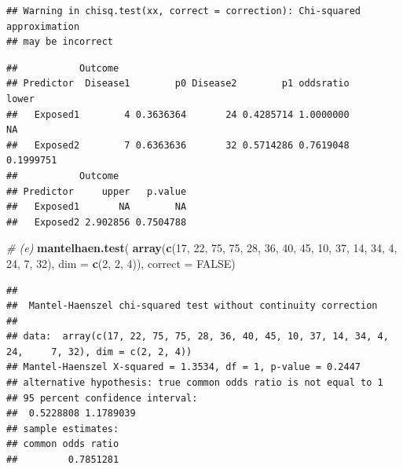 \documentclass[]{article}
\newenvironment{Shaded}{\begin{snugshade}}{\end{snugshade}}
\newcommand{\KeywordTok}[1]{\textcolor[rgb]{0.13,0.29,0.53}{\textbf{#1}}}
\newcommand{\DataTypeTok}[1]{\textcolor[rgb]{0.13,0.29,0.53}{#1}}
\newcommand{\DecValTok}[1]{\textcolor[rgb]{0.00,0.00,0.81}{#1}}
\newcommand{\CommentTok}[1]{\textcolor[rgb]{0.56,0.35,0.01}{\textit{#1}}}
\newcommand{\OtherTok}[1]{\textcolor[rgb]{0.56,0.35,0.01}{#1}}
\newcommand{\NormalTok}[1]{#1}
\begin{document}
\begin{verbatim}
## Warning in chisq.test(xx, correct = correction): Chi-squared approximation
## may be incorrect
\end{verbatim}

\begin{verbatim}
##           Outcome
## Predictor  Disease1        p0 Disease2        p1 oddsratio     lower
##   Exposed1        4 0.3636364       24 0.4285714 1.0000000        NA
##   Exposed2        7 0.6363636       32 0.5714286 0.7619048 0.1999751
##           Outcome
## Predictor     upper   p.value
##   Exposed1       NA        NA
##   Exposed2 2.902856 0.7504788
\end{verbatim}

\begin{Shaded}
\begin{Highlighting}[]
\CommentTok{# (e)}
\KeywordTok{mantelhaen.test}\NormalTok{(}
\KeywordTok{array}\NormalTok{(}\KeywordTok{c}\NormalTok{(}\DecValTok{17}\NormalTok{, }\DecValTok{22}\NormalTok{, }\DecValTok{75}\NormalTok{, }\DecValTok{75}\NormalTok{,}
  \DecValTok{28}\NormalTok{, }\DecValTok{36}\NormalTok{, }\DecValTok{40}\NormalTok{, }\DecValTok{45}\NormalTok{,}
  \DecValTok{10}\NormalTok{, }\DecValTok{37}\NormalTok{, }\DecValTok{14}\NormalTok{, }\DecValTok{34}\NormalTok{,}
  \DecValTok{4}\NormalTok{, }\DecValTok{24}\NormalTok{, }\DecValTok{7}\NormalTok{, }\DecValTok{32}\NormalTok{), }\DataTypeTok{dim =} \KeywordTok{c}\NormalTok{(}\DecValTok{2}\NormalTok{, }\DecValTok{2}\NormalTok{, }\DecValTok{4}\NormalTok{)), }
  \DataTypeTok{correct =} \OtherTok{FALSE}\NormalTok{)}
\end{Highlighting}
\end{Shaded}

\begin{verbatim}
## 
##  Mantel-Haenszel chi-squared test without continuity correction
## 
## data:  array(c(17, 22, 75, 75, 28, 36, 40, 45, 10, 37, 14, 34, 4, 24,     7, 32), dim = c(2, 2, 4))
## Mantel-Haenszel X-squared = 1.3534, df = 1, p-value = 0.2447
## alternative hypothesis: true common odds ratio is not equal to 1
## 95 percent confidence interval:
##  0.5228808 1.1789039
## sample estimates:
## common odds ratio 
##         0.7851281
\end{verbatim}
\end{document}
